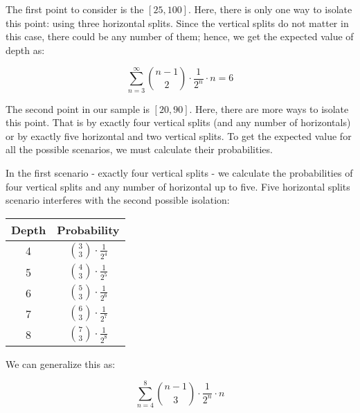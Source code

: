 The first point to consider is the $[25,100]$. Here, there is only one way to isolate this point: using three horizontal splits. Since the vertical splits do not matter in this case, there could be any number of them; hence, we get the expected value of depth as:

$$\sum_{n=3}^{\infty}\binom{n-1}{2}\cdot \frac{1}{2^n}\cdot n = 6$$    

The second point in our sample is $[20,90]$. Here, there are more ways to isolate this point. That is by exactly four vertical splits (and any number of horizontals) or by exactly five horizontal and two vertical splits. To get the expected value for all the possible scenarios, we must calculate their probabilities. 

In the first scenario - exactly four vertical splits - we calculate the probabilities of four vertical splits and any number of horizontal up to five. Five horizontal splits scenario interferes with the second possible isolation:

\begin{center}
\begin{tabular}{||c c||} 
 \hline
 Depth & Probability \\ [1ex] 
 \hline
 4 & $\binom{3}{3}\cdot \frac{1}{2^4}$\\ 
 \hline
 5 & $\binom{4}{3}\cdot \frac{1}{2^5}$  \\
 \hline
 6 & $\binom{5}{3}\cdot \frac{1}{2^6}$  \\
 \hline
 7 & $\binom{6}{3}\cdot \frac{1}{2^7}$  \\
 \hline
 8 & $\binom{7}{3}\cdot \frac{1}{2^8}$ \\ [1ex] 
 \hline
\end{tabular}
\end{center}

We can generalize this as:

$$\sum_{n=4}^{8}\binom{n-1}{3}\cdot \frac{1}{2^n}\cdot n$$

